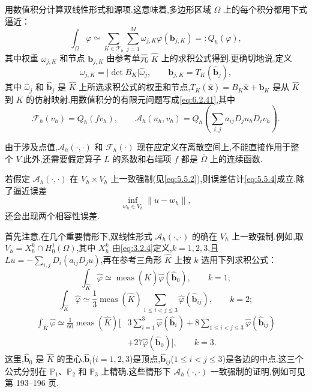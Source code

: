 用数值积分计算双线性形式和源项.这意味着,多边形区域 \(\Omega\) 上的每个积分都用下式逼近：
\begin{equation}\label{eq:6.2.42}
  \int_\Omega\varphi\simeq
    \sum_{K\in\mathcal T_h}\sum_{j=1}^M\omega_{j,K}\varphi(\boldsymbol{b}_{j,K})
    =:Q_h(\varphi),
\end{equation}
其中权重 \(\omega_{j,K}\) 和节点 \(\boldsymbol{b}_{j,K}\) 由参考单元 \(\widehat K\) 上的求积公式得到.更确切地说,定义
\[
  \omega_{j,K}=|\det B_K|\widehat\omega_j,\qquad
  \boldsymbol{b}_{j,K}=T_K(\widehat{\boldsymbol{b}}_j),
\]
其中 \(\widehat\omega_j\) 和 \(\widehat{\boldsymbol{b}}_j\) 是 \(\widehat K\) 上所选求积公式的权重和节点,\(T_K(\widehat{\boldsymbol{x}})=B_K\widehat{\boldsymbol{x}}+\boldsymbol{b}_K\) 是从 \(\widehat K\) 到 \(K\) 的仿射映射.用数值积分的有限元问题写成\eqref{eq:6.2.41},其中
\[
  \mathcal F_h(v_h)=Q_h(fv_h),\qquad
  \mathcal A_h(u_h,v_h)=Q_h\left(\sum_{i,j}a_{ij}D_ju_hD_iv_h\right).
\]

由于涉及点值,\(\mathcal A_h(\cdot,\cdot)\) 和 \(\mathcal F_h(\cdot)\) 现在应定义在离散空间上,不能直接作用于整个 \(V\).此外,还需要假定算子 \(L\) 的系数和右端项 \(f\) 都是 \(\overline\Omega\) 上的连续函数.

若假定 \(\mathcal A_h(\cdot,\cdot)\) 在 \(V_h\times V_h\) 上一致强制(见\eqref{eq:5.5.2}),则误差估计\eqref{eq:5.5.4}成立.除了逼近误差
\[
  \inf_{w_h\in V_h}\|u-w_h\|,
\]
还会出现两个相容性误差.

首先注意,在几个重要情形下,双线性形式 \(\mathcal A_h(\cdot,\cdot)\) 的确在 \(V_h\) 上一致强制.例如,取 \(V_h=X_h^k\cap H_0^1(\Omega)\),其中 \(X_h^k\) 由\eqref{eq:3.2.4}定义,\(k=1,2,3\),且 \(Lu=-\sum_{i,j}D_i(a_{ij}D_ju)\),再在参考三角形 \(\widehat K\) 上按 \(k\) 选用下列求积公式：
\begin{equation}\label{eq:6.2.43}
  \int_{\widehat K}\widehat\varphi
  \simeq\operatorname{meas}(\widehat K)\widehat\varphi(\widehat{\boldsymbol{b}}_0),
  \qquad k=1;
\end{equation}
\begin{equation}\label{eq:6.2.44}
  \int_{\widehat K}\widehat\varphi\simeq
  \frac13\operatorname{meas}(\widehat K)
      \sum_{1\le i<j\le3}\widehat\varphi(\widehat{\boldsymbol{b}}_{ij}),
  \qquad k=2;
\end{equation}
\begin{equation}\label{eq:6.2.45}
  \begin{aligned}
    \int_{\widehat K}\widehat\varphi\simeq
       \frac1{60}\operatorname{meas}(\widehat K)
       \biggl[&3\sum_{i=1}^3\widehat\varphi(\widehat{\boldsymbol{b}}_i)
           +8\sum_{1\le i<j\le3}\widehat\varphi(\widehat{\boldsymbol{b}}_{ij})\\[-2pt]
          &+27\widehat\varphi(\widehat{\boldsymbol{b}}_0)\biggr],\qquad k=3.
  \end{aligned}
\end{equation}
这里,\(\widehat{\boldsymbol{b}}_0\) 是 \(\widehat K\) 的重心,\(\widehat{\boldsymbol{b}}_i\)(\(i=1,2,3\))是顶点,\(\widehat{\boldsymbol{b}}_{ij}\)(\(1\le i<j\le3\))是各边的中点.这三个公式分别在 \(\mathbb P_1\)、\(\mathbb P_2\) 和 \(\mathbb P_3\) 上精确.这些情形下 \(\mathcal A_h(\cdot,\cdot)\) 一致强制的证明,例如可见第 193–196 页.

